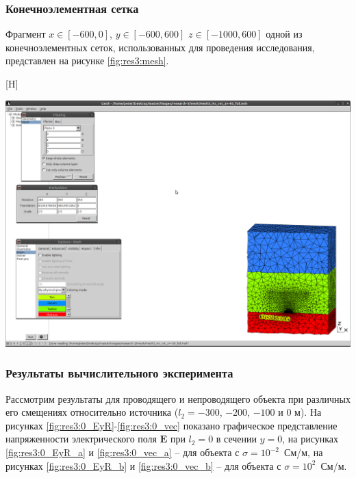 \documentclass[a4paper,14pt]{article}
\makeatletter
\renewenvironment{figure}[1][\fps@figure]{
  \edef\@tempa{\noexpand\@float{figure}[#1]}
  \@tempa
  \addtocounter{foofigure}{1}
}{
  \end@float
}
\makeatother
\begin{document}
\subsubsection{Конечноэлементная сетка}
Фрагмент $x \in [-600,0]$, $y \in [-600,600]$ $z \in [-1000,600]$ одной из конечноэлементных сеток, использованных для проведения исследования, представлен на рисунке \ref{fig:res3:mesh}.

\begin{figure}[H]
	\centering
	\includegraphics[trim=390mm 20mm 5mm 195mm,clip,scale=0.5]{research-3/mesh/mesh.png}
	\caption{фрагмент конечноэлементной сетки}
	\label{fig:res3:mesh}
\end{figure}

\subsubsection{Результаты вычислительного эксперимента}
Рассмотрим результаты для проводящего и непроводящего объекта при различных его смещениях относительно источника ($l_2=-300$, $-200$, $-100$ и $0$ м). На рисунках \ref{fig:res3:0_EyR}-\ref{fig:res3:0_vec} показано графическое представление напряженности электрического поля $\mathbf{E}$ при $l_2=0$ в сечении $y=0$, на рисунках \ref{fig:res3:0_EyR_a} и \ref{fig:res3:0_vec_a} -- для объекта с $\sigma=10^{-2}$~См/м, на рисунках \ref{fig:res3:0_EyR_b} и \ref{fig:res3:0_vec_b} -- для объекта с $\sigma=10^{2}$~См/м.

\end{document}
